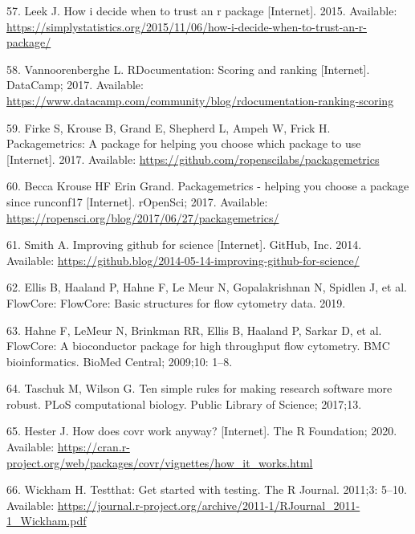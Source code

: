 \documentclass[10pt,letterpaper]{article}
\begin{document}
\leavevmode\hypertarget{ref-leek2015}{}%
57. Leek J. How i decide when to trust an r package {[}Internet{]}.
2015. Available:
\url{https://simplystatistics.org/2015/11/06/how-i-decide-when-to-trust-an-r-package/}

\leavevmode\hypertarget{ref-vannoorenberghe2017}{}%
58. Vannoorenberghe L. RDocumentation: Scoring and ranking
{[}Internet{]}. DataCamp; 2017. Available:
\url{https://www.datacamp.com/community/blog/rdocumentation-ranking-scoring}

\leavevmode\hypertarget{ref-packagemetrics}{}%
59. Firke S, Krouse B, Grand E, Shepherd L, Ampeh W, Frick H.
Packagemetrics: A package for helping you choose which package to use
{[}Internet{]}. 2017. Available:
\url{https://github.com/ropenscilabs/packagemetrics}

\leavevmode\hypertarget{ref-packagemetricsblog}{}%
60. Becca Krouse HF Erin Grand. Packagemetrics - helping you choose a
package since runconf17 {[}Internet{]}. rOpenSci; 2017. Available:
\url{https://ropensci.org/blog/2017/06/27/packagemetrics/}

\leavevmode\hypertarget{ref-smith2014}{}%
61. Smith A. Improving github for science {[}Internet{]}. GitHub, Inc.
2014. Available:
\url{https://github.blog/2014-05-14-improving-github-for-science/}

\leavevmode\hypertarget{ref-flowCore}{}%
62. Ellis B, Haaland P, Hahne F, Le Meur N, Gopalakrishnan N, Spidlen J,
et al. FlowCore: FlowCore: Basic structures for flow cytometry data.
2019.

\leavevmode\hypertarget{ref-hahne2009}{}%
63. Hahne F, LeMeur N, Brinkman RR, Ellis B, Haaland P, Sarkar D, et al.
FlowCore: A bioconductor package for high throughput flow cytometry. BMC
bioinformatics. BioMed Central; 2009;10: 1--8.

\leavevmode\hypertarget{ref-taschuk2017}{}%
64. Taschuk M, Wilson G. Ten simple rules for making research software
more robust. PLoS computational biology. Public Library of Science;
2017;13.

\leavevmode\hypertarget{ref-hester2020}{}%
65. Hester J. How does covr work anyway? {[}Internet{]}. The R
Foundation; 2020. Available:
\url{https://cran.r-project.org/web/packages/covr/vignettes/how_it_works.html}

\leavevmode\hypertarget{ref-wickham2011}{}%
66. Wickham H. Testthat: Get started with testing. The R Journal.
2011;3: 5--10. Available:
\url{https://journal.r-project.org/archive/2011-1/RJournal_2011-1_Wickham.pdf}
\end{document}
